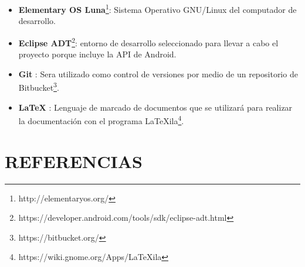 \documentclass{pre-tfg}
\begin{document}
\begin{itemize}
\item \textbf{Elementary OS Luna}\footnote{http://elementaryos.org/}: Sistema Operativo
  GNU/Linux del computador de desarrollo.
\item \textbf{Eclipse
    ADT}\footnote{https://developer.android.com/tools/sdk/eclipse-adt.html}: entorno de
  desarrollo seleccionado para llevar a cabo el proyecto porque incluye la API de Android.
\item \textbf{Git} \cite{Hinojosa14} : Sera utilizado como control de versiones por medio
  de un repositorio de Bitbucket\footnote{https://bitbucket.org/}.
  \item \textbf{\LaTeX} \cite{Lamport86} : Lenguaje de marcado de documentos que se
    utilizará para realizar la documentación con el programa
    LaTeXila\footnote{https://wiki.gnome.org/Apps/LaTeXila}.
\end{itemize}

\newpage

\section{REFERENCIAS}

\renewcommand\refname{}
\vspace{-1cm}



\end{document}
